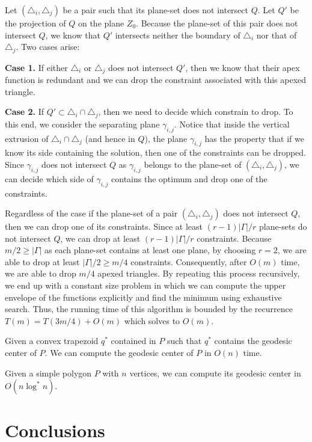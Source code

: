 \documentclass[a4paper,UKenglish]{lipics}
\begin{document}
Let $(\triangle_i, \triangle_j)$ be a pair such that its plane-set does not intersect $Q$. 
Let $Q'$ be the projection of $Q$ on the plane $Z_0$. Because the plane-set of this pair does not intersect $Q$, we know that $Q'$ intersects neither the boundary of $\triangle_i$ nor that of $\triangle_j$.
Two cases arise:

\textbf{Case 1.} If either $\triangle_i$ or $\triangle_j$ does not intersect $Q'$, then we know that their apex function is redundant and we can drop the constraint associated with this apexed triangle.

\textbf{Case 2.} If $Q'\subset \triangle_i\cap \triangle_j$, then we need to decide which constrain to drop. 
To this end, we consider the separating plane $\gamma_{i,j}$. Notice that inside the vertical extrusion of $\triangle_i\cap \triangle_j$ (and hence in $Q$), the plane $\gamma_{i,j}$ has the property that if we know its side containing the solution, then one of the constraints can be dropped. Since $\gamma_{i,j}$ does not intersect $Q$ as $\gamma_{i,j}$ belongs to the plane-set of $(\triangle_i, \triangle_j)$, we can decide which side of $\gamma_{i,j}$ contains the optimum and drop one of the constraints.
\vspace{.05in}

Regardless of the case if the plane-set of a pair $(\triangle_i, \triangle_j)$ does not intersect $Q$, then we can drop one of its constraints. Since at least $(r-1)|\Gamma|/r$ plane-sets do not intersect $Q$, we can drop at least $(r-1)|\Gamma|/r$ constraints.
Because $m/2 \geq |\Gamma| $ as each plane-set contains at least one plane, by choosing $r = 2$, we are able to drop at least $|\Gamma|/2 \geq m/4$ constraints.
Consequently, after $O(m)$ time, we are able to drop $m/4$ apexed triangles.
By repeating this process recursively, we end up with a constant size problem in which we can compute the upper envelope of the functions explicitly and find the minimum using exhaustive search. 
Thus, the running time of this algorithm is bounded by the recurrence $T(m) = T(3m/4) + O(m)$ which solves to $O(m)$. 

\begin{theorem}
Given a convex trapezoid $q^*$ contained in $P$ such that $q^*$ contains the geodesic center of $P$. 
We can compute the geodesic center of $P$ in $O(n)$ time.
\end{theorem}

\begin{corollary}
Given a simple polygon $P$ with $n$ vertices, we can compute its geodesic center in $O(n \log ^* n)$.
\end{corollary}

\section{Conclusions}



\end{document}
